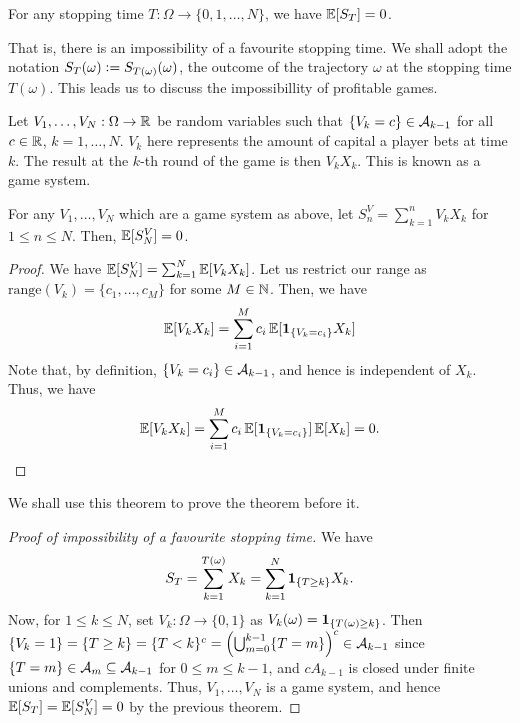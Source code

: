 \begin{theorem}
    For any stopping time $T:\Omega \to \{0,1,\ldots,N\}$, we have $\mathbb{E}[S_{T}] = 0$.
\end{theorem}
That is, there is an impossibility of a favourite stopping time. We shall adopt the notation $S_{T}(\omega) \vcentcolon= S_{T(\omega)}(\omega)$, the outcome of the trajectory $\omega$ at the stopping time $T(\omega)$. This leads us to discuss the impossibillity of profitable games.


Let $V_{1},\ldots,V_{N}:\Omega \to \mathbb{R}$ be random variables such that $\{V_{k}=c\} \in \mathcal{A}_{k-1}$ for all $c \in \mathbb{R}$, $k = 1,\ldots,N$. $V_{k}$ here represents the amount of capital a player bets at time $k$. The result at the $k$-th round of the game is then $V_{k}X_{k}$. This is known as a game system.

\begin{theorem}
    For any $V_{1},\ldots,V_{N}$ which are a game system as above, let $S_{n}^{V} = \sum_{k=1}^{n} V_{k}X_{k}$ for $1 \leq n \leq N$. Then, $\mathbb{E}[S_{N}^{V}] = 0$.
\end{theorem}

\begin{proof}
    We have $\mathbb{E}[S_{N}^{V}] = \sum_{k=1}^{N} \mathbb{E}[V_{k}X_{k}]$. Let us restrict our range as $\mathrm{range}(V_{k}) = \{c_{1},\ldots,c_{M}\}$ for some $M \in \mathbb{N}$. Then, we have
    \begin{align}
        \mathbb{E}[V_{k}X_{k}] = \sum_{i=1}^{M} c_{i} \, \mathbb{E}[\textbf{1}_{\{V_{k}=c_{i}\}} X_{k}]
    \end{align}
    Note that, by definition, $\{V_{k}=c_{i}\} \in \mathcal{A}_{k-1}$, and hence is independent of $X_{k}$. Thus, we have
    \begin{align}
        \mathbb{E}[V_{k}X_{k}] = \sum_{i=1}^{M} c_{i} \, \mathbb{E}[\textbf{1}_{\{V_{k}=c_{i}\}}] \, \mathbb{E}[X_{k}] = 0.
    \end{align}
\end{proof}

We shall use this theorem to prove the theorem before it.

\begin{proof}[Proof of impossibility of a favourite stopping time]
    We have
    \begin{align}
        S_{T} = \sum_{k=1}^{T(\omega)} X_{k} = \sum_{k=1}^{N} \textbf{1}_{\{T \geq k\}} X_{k}.
    \end{align}
    Now, for $1 \leq k \leq N$, set $V_{k}:\Omega \to \{0,1\}$ as $V_{k}(\omega) = \textbf{1}_{\{T(\omega) \geq k\}}$. Then $\{V_{k} = 1\} = \{T \geq k\} = \{T < k\}^{c} = \left( \bigcup_{m=0}^{k-1} \{T=m\} \right)^{c} \in \mathcal{A}_{k-1}$ since $\{T=m\} \in \mathcal{A}_{m} \subseteq \mathcal{A}_{k-1}$ for $0 \leq m \leq k-1$, and $cA_{k-1}$ is closed under finite unions and complements. Thus, $V_{1},\ldots,V_{N}$ is a game system, and hence $\mathbb{E}[S_{T}] = \mathbb{E}[S_{N}^{V}] = 0$ by the previous theorem.
\end{proof}

